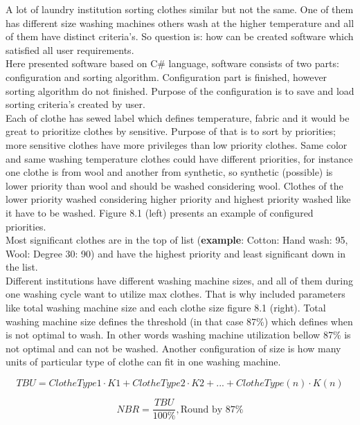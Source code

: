 A lot of laundry institution sorting clothes similar but not the same. One of them has different size washing machines others wash at the higher temperature and all of them have distinct criteria’s.   So question is: how can be created software which satisfied all user requirements. \\  Here presented software based on C\# language, software consists of two parts: configuration and sorting algorithm. Configuration part is finished, however sorting algorithm do not finished. Purpose of the configuration is to save and load sorting criteria’s created by user. 
\\
Each of clothe has sewed label which defines temperature, fabric and it would be great to prioritize clothes by sensitive. Purpose of that is to sort by priorities; more sensitive clothes have more privileges than low priority clothes. Same color and same washing temperature clothes could have different priorities, for instance one clothe is from wool and another from synthetic, so synthetic (possible) is lower priority than wool and should be washed considering wool. Clothes of the lower priority washed considering higher priority and highest priority washed like it have to be washed. Figure 8.1 (left) presents an example of configured priorities. \\ Most significant clothes are in the top of list (\textbf{example}: Cotton: Hand wash: 95, Wool: Degree 30: 90) and have the highest priority and least significant down in the list. \\ Different institutions have different washing machine sizes, and all of them during one washing cycle want to utilize max clothes. That is why included parameters like total washing machine size and each clothe size figure 8.1 (right). Total washing machine size defines the threshold (in that case 87\%) which defines when is not optimal to wash. In other words washing machine utilization bellow 87\% is not optimal and can not be washed. Another configuration of size is how many units of particular type of clothe can fit in one washing machine. 


\begin{equation}
TBU=ClotheType1\cdot K1+ClotheType2\cdot K2+...+ClotheType(n)\cdot K(n) \label{eq:eq1}
\end{equation}


\begin{equation}
NBR=\frac{TBU}{100\%},\textrm{Round by 87\%} \label{eq:eq2}
\end{equation}


